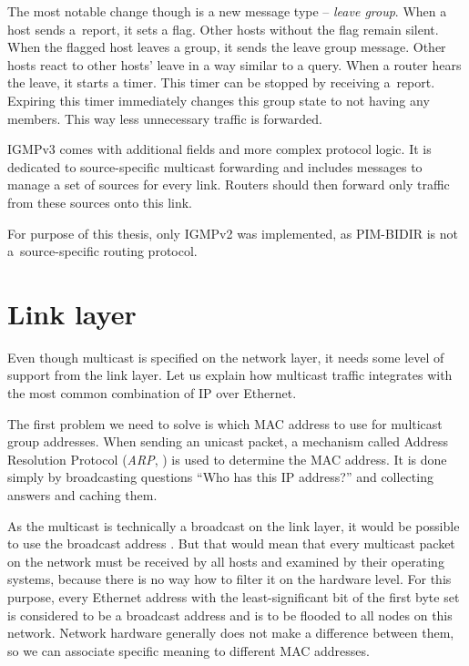 The most notable change though is a new message type -- \emph{leave group}. When a host
sends a~report, it sets a flag. Other hosts without the flag remain silent. When
the flagged host leaves a group, it sends the leave group message. Other hosts
react to other hosts' leave in a way similar to a query. When a router hears the leave,
it starts a timer. This timer can be stopped by receiving a~report. Expiring this
timer immediately changes this group state to not having any members. This way
less unnecessary traffic is forwarded.

IGMPv3 comes with additional fields and more complex protocol logic. It is
dedicated to source-specific multicast forwarding and includes messages to manage
a set of sources for every link. Routers should then forward only traffic from
these sources onto this link.

For purpose of this thesis, only IGMPv2 was implemented, as PIM-BIDIR is not
a~source-specific routing protocol.

\section{Link layer}

Even though multicast is specified on the network layer, it needs some level of
support from the link layer. Let us explain how multicast traffic integrates with
the most common combination of IP over Ethernet.

The first problem we need to solve is which MAC address to use for multicast
group addresses. When sending an unicast packet, a mechanism called Address
Resolution Protocol (\emph{ARP}, ) is used to determine the MAC
address. It is done simply by broadcasting questions ``Who has this IP
address?'' and collecting answers and caching them.

As the multicast is technically a broadcast on the link layer, it would be possible to
use the broadcast address .
But that would mean that every multicast packet on the network must be received by all
hosts and examined by their operating systems, because there is no way how to filter
it on the hardware level. For this purpose, every Ethernet address with the
least-significant bit of the first byte set is considered to be
a broadcast address and is to be flooded to all nodes on this network. Network
hardware generally does not make a difference between them, so we can associate
specific meaning to different MAC addresses.

